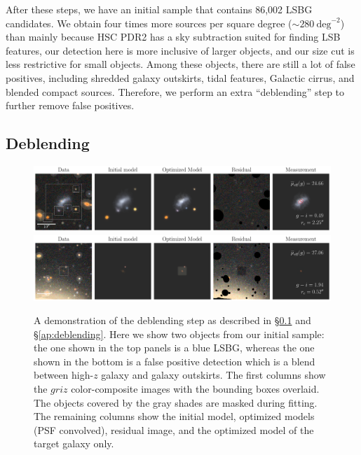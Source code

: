\documentclass[twocolumn,astrosymb,twocolappendix]{aastex631}
\begin{document}
\begin{CJK*}{UTF8}{gbsn}
After these steps, we have an initial sample that contains 86,002 LSBG candidates. We obtain four times more sources per square degree ($\sim 280\ \mathrm{deg}^{-2}$) than  mainly because HSC PDR2 has a sky subtraction suited for finding LSB features, our detection here is more inclusive of larger objects, and our size cut is less restrictive for small objects. Among these objects, there are still a lot of false positives, including shredded galaxy outskirts, tidal features, Galactic cirrus, and blended compact sources. Therefore, we perform an extra ``deblending'' step to further remove false positives.  


\subsection{Deblending}\label{sec:deblending}

\begin{figure}
	\vbox{ 
		\centering
		\includegraphics[width=1\linewidth]{vanilla_scarlet_demo.pdf}
		\includegraphics[width=1\linewidth]{vanilla_scarlet_demo2.pdf}
	}
	\caption{A demonstration of the deblending step as described in \S\ref{sec:deblending} and \S\ref{ap:deblending}. Here we show two objects from our initial sample: the one shown in the top panels is a blue LSBG, whereas the one shown in the bottom is a false positive detection which is a blend between high-$z$ galaxy and galaxy outskirts. The first columns show the $griz$ color-composite images with the bounding boxes overlaid. The objects covered by the gray shades are masked during fitting. The remaining columns show the initial model, optimized models (PSF convolved), residual image, and the optimized model of the target galaxy only. 
	}
	\label{fig:vanilla_scarlet_demo}
\end{figure}


\end{CJK*}
\end{document}
